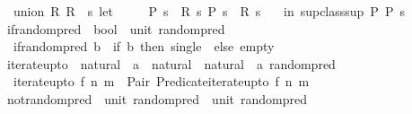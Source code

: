 \begin{isabellebody}
\isanewline
\ \ {\isachardoublequoteopen}union\ R{}\ R{}\ {\isacharequal}{\kern0pt}\ {\isacharparenleft}{\kern0pt}{\isasymlambda}s{\isachardot}{\kern0pt}\ let\isanewline
\ \ \ \ \ {\isacharparenleft}{\kern0pt}P{}{\isacharcomma}{\kern0pt}\ s{\isacharprime}{\kern0pt}{\isacharparenright}{\kern0pt}\ {\isacharequal}{\kern0pt}\ R{}\ s{\isacharsemicolon}{\kern0pt}\ {\isacharparenleft}{\kern0pt}P{}{\isacharcomma}{\kern0pt}\ s{\isacharprime}{\kern0pt}{\isacharprime}{\kern0pt}{\isacharparenright}{\kern0pt}\ {\isacharequal}{\kern0pt}\ R{}\ s{\isacharprime}{\kern0pt}\isanewline
\ \ \ in\ {\isacharparenleft}{\kern0pt}sup{\isacharunderscore}{\kern0pt}class{\isachardot}{\kern0pt}sup\ P{}\ P{}{\isacharcomma}{\kern0pt}\ s{\isacharprime}{\kern0pt}{\isacharprime}{\kern0pt}{\isacharparenright}{\kern0pt}{\isacharparenright}{\kern0pt}{\isachardoublequoteclose}\isanewline
\isanewline
{}\isamarkupfalse%
\ if{\isacharunderscore}{\kern0pt}randompred\ {\isacharcolon}{\kern0pt}{\isacharcolon}{\kern0pt}\ {\isachardoublequoteopen}bool\ {\isasymRightarrow}\ unit\ random{\isacharunderscore}{\kern0pt}pred{\isachardoublequoteclose}\isanewline
{}\isanewline
\ \ {\isachardoublequoteopen}if{\isacharunderscore}{\kern0pt}randompred\ b\ {\isacharequal}{\kern0pt}\ {\isacharparenleft}{\kern0pt}if\ b\ then\ single\ {\isacharparenleft}{\kern0pt}{\isacharparenright}{\kern0pt}\ else\ empty{\isacharparenright}{\kern0pt}{\isachardoublequoteclose}\isanewline
\isanewline
{}\isamarkupfalse%
\ iterate{\isacharunderscore}{\kern0pt}upto\ {\isacharcolon}{\kern0pt}{\isacharcolon}{\kern0pt}\ {\isachardoublequoteopen}{\isacharparenleft}{\kern0pt}natural\ {\isasymRightarrow}\ {\isacharprime}{\kern0pt}a{\isacharparenright}{\kern0pt}\ {\isacharequal}{\kern0pt}{\isachargreater}{\kern0pt}\ natural\ {\isasymRightarrow}\ natural\ {\isasymRightarrow}\ {\isacharprime}{\kern0pt}a\ random{\isacharunderscore}{\kern0pt}pred{\isachardoublequoteclose}\isanewline
{}\isanewline
\ \ {\isachardoublequoteopen}iterate{\isacharunderscore}{\kern0pt}upto\ f\ n\ m\ {\isacharequal}{\kern0pt}\ Pair\ {\isacharparenleft}{\kern0pt}Predicate{\isachardot}{\kern0pt}iterate{\isacharunderscore}{\kern0pt}upto\ f\ n\ m{\isacharparenright}{\kern0pt}{\isachardoublequoteclose}\isanewline
\isanewline
{}\isamarkupfalse%
\ not{\isacharunderscore}{\kern0pt}randompred\ {\isacharcolon}{\kern0pt}{\isacharcolon}{\kern0pt}\ {\isachardoublequoteopen}unit\ random{\isacharunderscore}{\kern0pt}pred\ {\isasymRightarrow}\ unit\ random{\isacharunderscore}{\kern0pt}pred{\isachardoublequoteclose}\isanewline

\end{isabellebody}
